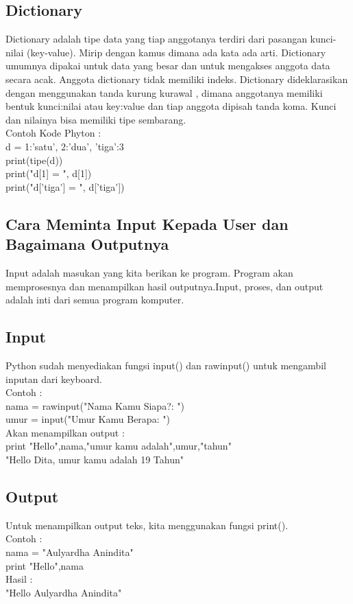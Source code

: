 \subsection{Dictionary}
Dictionary adalah tipe data yang tiap anggotanya terdiri dari pasangan kunci-nilai (key-value). Mirip dengan kamus dimana ada kata ada arti. Dictionary umumnya dipakai untuk data yang besar dan untuk mengakses anggota data secara acak. Anggota dictionary tidak memiliki indeks. Dictionary dideklarasikan dengan menggunakan tanda kurung kurawal { }, dimana anggotanya memiliki bentuk kunci:nilai atau key:value dan tiap anggota dipisah tanda koma. Kunci dan nilainya bisa memiliki tipe sembarang.\\
Contoh Kode Phyton : \\
d = {1:'satu', 2:'dua', 'tiga':3}\\
print(tipe(d))\\
print("d[1] = ", d[1])\\
print("d['tiga'] = ", d['tiga'])\\

\subsection{Cara Meminta Input Kepada User dan Bagaimana Outputnya}
Input adalah masukan yang kita berikan ke program.
Program akan memprosesnya dan menampilkan hasil outputnya.Input, proses, dan output adalah inti dari semua program komputer.\\
\subsection{Input}
Python sudah menyediakan fungsi input() dan rawinput() untuk mengambil inputan dari keyboard.\\
Contoh :\\
nama = rawinput("Nama Kamu Siapa?: ")\\
umur = input("Umur Kamu Berapa: ")\\

Akan menampilkan output :\\
print "Hello",nama,"umur kamu adalah",umur,"tahun"\\
"Hello Dita, umur kamu adalah 19 Tahun"\\
\subsection{Output}
Untuk menampilkan output teks, kita menggunakan fungsi print().\\
Contoh :\\
nama = "Aulyardha Anindita"\\
print "Hello",nama\\
Hasil :\\
"Hello Aulyardha Anindita"\\

